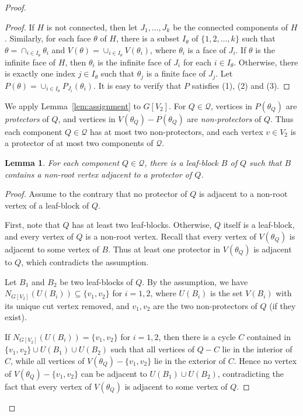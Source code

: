 \documentclass[11pt,a4paper]{article}
\newtheorem{lem}{Lemma}
\theoremstyle{definition}
\begin{document}
\begin{proof}
\begin{proof}
If $H$ is not connected, then let $J_1, \ldots, J_k$ be the connected components of $H$. Similarly, for each face $\theta$ of $H$, there is a subset $I_\theta$ of $\{1,2,\ldots, k\}$ such that $\theta=\cap_{i \in I_\theta} \theta_i$ and $V(\theta) = \cup_{i \in I_\theta}V(\theta_i)$, where $\theta_i$ is a face of $J_i$. If $\theta$ is the infinite face of $H$, then  $\theta_i$ is the infinite  face of $J_i$ for each $i \in I_\theta$. Otherwise, there is exactly one index $j \in I_\theta$ such that $\theta_j$ is a finite face of $J_j$.   Let $P(\theta)=\cup_{i \in I_\theta}P_{J_i}(\theta_i)$. It is easy to verify that $P$ satisfies (1), (2) and (3).
\end{proof}




We apply Lemma~\ref{lem:assignment} to $G[V_2]$.
For $Q\in\mathcal{Q}$, vertices in $P(\theta_Q)$ are {\em  protectors} of $Q$, and vertices in $V(\theta_Q)-P(\theta_Q)$ are {\em non-protectors} of $Q$. Thus each
component $Q\in\mathcal{Q}$ has at most two non-protectors, and 
each vertex $v\in V_2$ is a protector of at most two
components of $\mathcal{Q}$.

\begin{lem}
    \label{lem:protector}
    For each component $Q\in\mathcal Q$, there is a leaf-block $B$ of $Q$ such that $B$ contains a non-root vertex adjacent to a protector of $Q$.
\end{lem}

\begin{proof}
Assume to the contrary that no protector of $Q$ is adjacent to a non-root vertex of a leaf-block of $Q$.

First, note that $Q$ has at least two leaf-blocks. Otherwise, $Q$ itself is a leaf-block, and every vertex of $Q$ is a non-root vertex. Recall that every vertex of $V(\theta_Q)$ is adjacent to some vertex of $B$. Thus at least one protector in $V(\theta_Q)$ is adjacent to $Q$, which contradicts the assumption.

Let $B_1$ and $B_2$ be two leaf-blocks of $Q$. By the assumption, we have $
N_{G[V_2]}(U(B_i))\subseteq \{v_1,v_2\}$ for $i=1,2$,
where $U(B_i)$ is the set  $V(B_i)$ with its unique cut vertex removed, and $v_1,v_2$ are the two non-protectors of $Q$ (if they exist).

If $N_{G[V_2]}(U(B_i))=\{v_1,v_2\}$ for $i=1,2$, then there is a cycle $C$ contained in
$\{v_1,v_2\}\cup U(B_1)\cup U(B_2)$
such that all vertices of $Q-C$ lie in the interior of $C$, while
all vertices of $V(\theta_Q)-\{v_1,v_2\}$ lie in the exterior of $C$. Hence no vertex of $V(\theta_Q)-\{v_1,v_2\}$ can be adjacent to $U(B_1)\cup U(B_2)$, contradicting the fact that every vertex of $V(\theta_Q)$ is adjacent to some vertex of $Q$.


\end{proof}
\end{proof}
\end{document}
